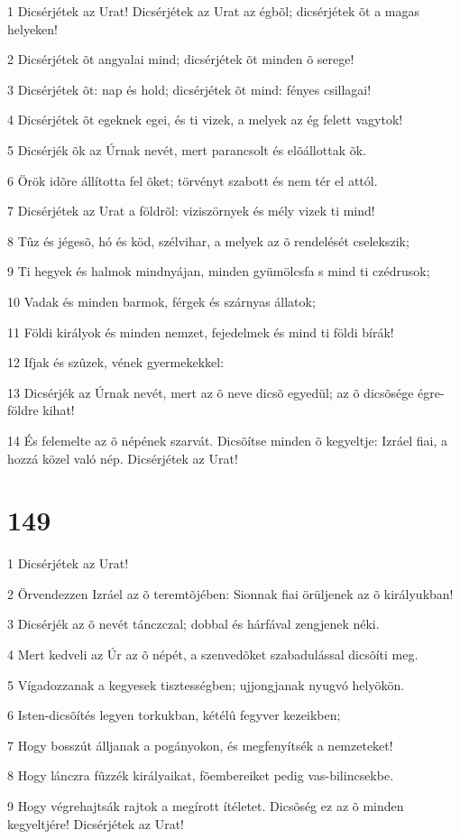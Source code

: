 \par 1 Dicsérjétek az Urat! Dicsérjétek az Urat az égbõl; dicsérjétek õt a magas helyeken!
\par 2 Dicsérjétek õt angyalai mind; dicsérjétek õt minden õ serege!
\par 3 Dicsérjétek õt: nap és hold; dicsérjétek õt mind: fényes csillagai!
\par 4 Dicsérjétek õt egeknek egei, és ti vizek, a melyek az ég felett vagytok!
\par 5 Dicsérjék õk az Úrnak nevét, mert parancsolt és elõállottak õk.
\par 6 Örök idõre állította fel õket; törvényt szabott és nem tér el attól.
\par 7 Dicsérjétek az Urat a földrõl: viziszörnyek és mély vizek ti mind!
\par 8 Tûz és jégesõ, hó és köd, szélvihar, a melyek az õ rendelését cselekszik;
\par 9 Ti hegyek és halmok mindnyájan, minden gyümölcsfa s mind ti czédrusok;
\par 10 Vadak és minden barmok, férgek és szárnyas állatok;
\par 11 Földi királyok és minden nemzet, fejedelmek és mind ti földi bírák!
\par 12 Ifjak és szûzek, vének gyermekekkel:
\par 13 Dicsérjék az Úrnak nevét, mert az õ neve dicsõ egyedül; az õ dicsõsége égre-földre kihat!
\par 14 És felemelte az õ népének szarvát. Dicsõítse minden õ kegyeltje: Izráel fiai, a hozzá közel való nép. Dicsérjétek az Urat!

\chapter{149}

\par 1 Dicsérjétek az Urat!
\par 2 Örvendezzen Izráel az õ teremtõjében: Sionnak fiai örüljenek az õ királyukban!
\par 3 Dicsérjék az õ nevét tánczczal; dobbal és hárfával zengjenek néki.
\par 4 Mert kedveli az Úr az õ népét, a szenvedõket szabadulással dicsõíti meg.
\par 5 Vígadozzanak a kegyesek tisztességben; ujjongjanak nyugvó helyökön.
\par 6 Isten-dicsõítés legyen torkukban, kétélû fegyver kezeikben;
\par 7 Hogy bosszút álljanak a pogányokon, és megfenyítsék a nemzeteket!
\par 8 Hogy lánczra fûzzék királyaikat, fõembereiket pedig vas-bilincsekbe.
\par 9 Hogy végrehajtsák rajtok a megírott ítéletet. Dicsõség ez az õ minden kegyeltjére! Dicsérjétek az Urat!

